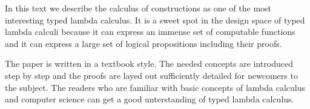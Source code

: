 In this text we describe the calculus of constructions as one of the most
interesting typed lambda calculus. It is a sweet spot in the design space of
typed lambda calculi because it can express an immense set of computable
functions and it can express a large set of logical propositions including their
proofs.

The paper is written in a textbook style.  The needed concepts are introduced
step by step and the proofs are layed out sufficiently detailed for newcomers to
the subject.  The readers who are familiar with basic concepts of lambda
calculus and computer science can get a good unterstanding of typed lambda
calculus.
